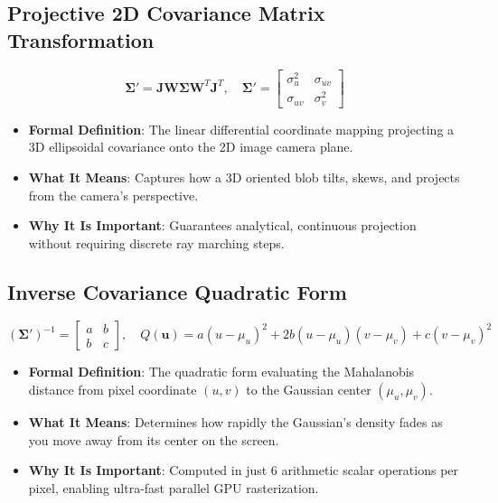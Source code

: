 \documentclass[11pt,a4paper]{article}
\theoremstyle{definition}
\begin{document}
\subsection{Projective 2D Covariance Matrix Transformation}
{\boldmath
\begin{equation}
\boldsymbol{\Sigma}' = \mathbf{J} \mathbf{W} \boldsymbol{\Sigma} \mathbf{W}^T \mathbf{J}^T, \quad \boldsymbol{\Sigma}' = \begin{bmatrix} \sigma_{u}^2 & \sigma_{uv} \\ \sigma_{uv} & \sigma_{v}^2 \end{bmatrix}
\end{equation}
}
\begin{itemize}
    \item \textbf{Formal Definition}: The linear differential coordinate mapping projecting a 3D ellipsoidal covariance onto the 2D image camera plane.
    \item \textbf{What It Means}: Captures how a 3D oriented blob tilts, skews, and projects from the camera's perspective.
    \item \textbf{Why It Is Important}: Guarantees analytical, continuous projection without requiring discrete ray marching steps.
\end{itemize}

\subsection{Inverse Covariance Quadratic Form}
{\boldmath
\begin{equation}
(\boldsymbol{\Sigma}')^{-1} = \begin{bmatrix} a & b \\ b & c \end{bmatrix}, \quad Q(\mathbf{u}) = a (u - \mu_u)^2 + 2b (u - \mu_u)(v - \mu_v) + c (v - \mu_v)^2
\end{equation}
}
\begin{itemize}
    \item \textbf{Formal Definition}: The quadratic form evaluating the Mahalanobis distance from pixel coordinate $(u, v)$ to the Gaussian center $(\mu_u, \mu_v)$.
    \item \textbf{What It Means}: Determines how rapidly the Gaussian's density fades as you move away from its center on the screen.
    \item \textbf{Why It Is Important}: Computed in just 6 arithmetic scalar operations per pixel, enabling ultra-fast parallel GPU rasterization.
\end{itemize}
\end{document}
